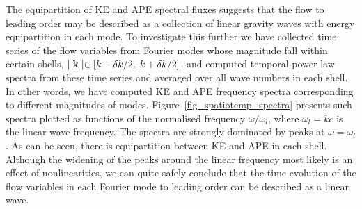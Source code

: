 \documentclass{jfm}
\begin{document}
The equipartition of KE and APE spectral fluxes suggests that the flow to
leading order may be described as a collection of linear gravity waves with energy
equipartition in each mode. To investigate this further we have
collected time series of the flow variables from Fourier modes whose magnitude
fall within certain shells, $ \mid {\bf k} \mid \in [ k -\delta k/2, \; k+
\delta k/2] $, and computed temporal power law spectra from these time series
and averaged over all wave numbers in each shell. In other words, we have
computed KE and APE frequency spectra corresponding to different magnitudes of
modes. Figure~\ref{fig_spatiotemp_spectra} presents such spectra plotted as 
functions of the normalised frequency $\omega/\omega_l$, where $ \omega_l = kc
$ is the linear wave frequency. The spectra are strongly dominated by peaks at
$\omega = \omega_l$. As can be seen, there is equipartition between KE and APE
in each shell. Although the widening of the peaks around the linear frequency
most likely is an effect of nonlinearities, we can quite safely conclude that
the time evolution of the flow variables in each Fourier mode to leading order
can be described as a linear wave.
\end{document}
